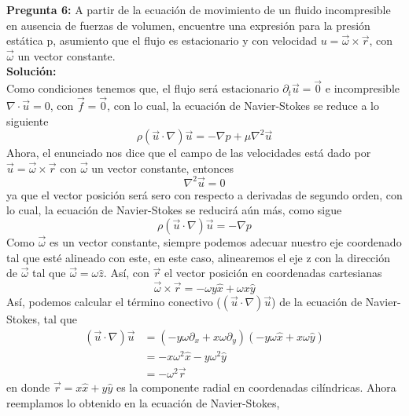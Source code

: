 \documentclass[11pt,letterpaper]{article}
\begin{document}
\textbf{Pregunta 6:} A partir de la ecuación de movimiento de un fluido incompresible en ausencia de fuerzas de volumen, encuentre una expresión para la presión estática p, asumiento que el flujo es estacionario y con velocidad $u=\vec{\omega}\times\vec{r}$, con $\vec{\omega}$ un vector constante. \\
\textbf{Solución:} \\
Como condiciones tenemos que, el flujo será estacionario $\partial_t\vec{u}=\vec{0}$ e incompresible $\nabla \cdot \vec{u}=0$, con $\vec{f}=\vec{0}$, con lo cual, la ecuación de Navier-Stokes se reduce a lo siguiente
\begin{equation}
  \rho(\vec{u}\cdot \nabla)\vec{u} = -\nabla p +\mu \nabla^2\vec{u} 
\end{equation}
Ahora, el enunciado nos dice que el campo de las velocidades está dado por $\vec{u}=\vec{\omega}\times\vec{r}$ con $\vec{\omega}$ un vector constante, entonces
\begin{equation}
  \nabla^2\vec{u}=0
\end{equation}
ya que el vector posición será sero con respecto a derivadas de segundo orden, con lo cual, la ecuación de Navier-Stokes se reducirá aún más, como sigue
\begin{equation}
  \rho(\vec{u}\cdot\nabla)\vec{u} = -\nabla p
\end{equation}
Como $\vec{\omega}$ es un vector constante, siempre podemos adecuar nuestro eje coordenado tal que esté alineado con este, en este caso, alinearemos el eje z con la dirección de $\vec{\omega}$ tal que $\vec{\omega}=\omega\hat{z}$. Así, con $\vec{r}$ el vector posición en coordenadas cartesianas 
\begin{equation}
  \vec{\omega}\times\vec{r}= -\omega y\hat{x}+\omega x \hat{y}
\end{equation}
Así, podemos calcular el término conectivo ($(\vec{u}\cdot\nabla)\vec{u}$) de la ecuación de Navier-Stokes, tal que
\begin{align*}
  (\vec{u}\cdot\nabla)\vec{u}  &= \left(-y\omega\partial_x + x\omega\partial_y \right)(-y\omega\hat{x}+x\omega\hat{y}) \\
  & = -x\omega^2\hat{x}-y\omega^2\hat{y} \\
  & = -\omega^2\vec{r}
\end{align*}
en donde $\vec{r}=x\hat{x}+y\hat{y}$ es la componente radial en coordenadas cilíndricas. Ahora reemplamos lo obtenido en la ecuación de Navier-Stokes,
\end{document}
